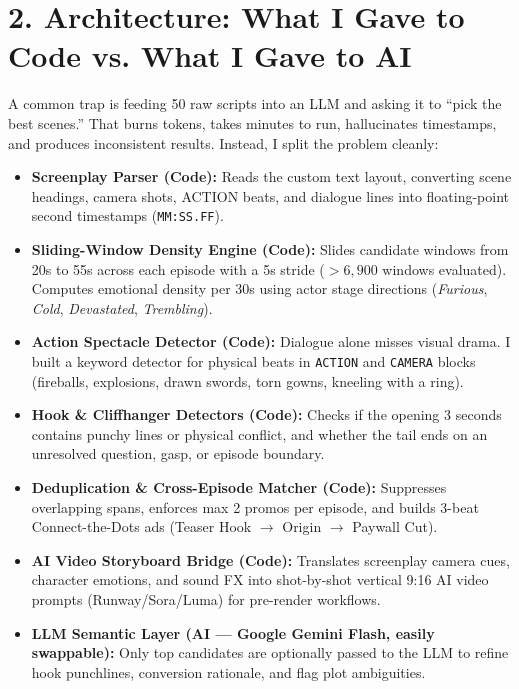 \documentclass[9.5pt,a4paper]{article}
\begin{document}
\section{2. Architecture: What I Gave to Code vs. What I Gave to AI}
A common trap is feeding 50 raw scripts into an LLM and asking it to ``pick the best scenes.'' That burns tokens, takes minutes to run, hallucinates timestamps, and produces inconsistent results. Instead, I split the problem cleanly:

\begin{itemize}
    \item \textbf{Screenplay Parser (Code):} Reads the custom text layout, converting scene headings, camera shots, ACTION beats, and dialogue lines into floating-point second timestamps (\texttt{MM:SS.FF}).
    \item \textbf{Sliding-Window Density Engine (Code):} Slides candidate windows from 20s to 55s across each episode with a 5s stride ($>6{,}900$ windows evaluated). Computes emotional density per 30s using actor stage directions (\textit{Furious}, \textit{Cold}, \textit{Devastated}, \textit{Trembling}).
    \item \textbf{Action Spectacle Detector (Code):} Dialogue alone misses visual drama. I built a keyword detector for physical beats in \texttt{ACTION} and \texttt{CAMERA} blocks (fireballs, explosions, drawn swords, torn gowns, kneeling with a ring).
    \item \textbf{Hook \& Cliffhanger Detectors (Code):} Checks if the opening 3 seconds contains punchy lines or physical conflict, and whether the tail ends on an unresolved question, gasp, or episode boundary.
    \item \textbf{Deduplication \& Cross-Episode Matcher (Code):} Suppresses overlapping spans, enforces max 2 promos per episode, and builds 3-beat Connect-the-Dots ads (Teaser Hook $\to$ Origin $\to$ Paywall Cut).
    \item \textbf{AI Video Storyboard Bridge (Code):} Translates screenplay camera cues, character emotions, and sound FX into shot-by-shot vertical 9:16 AI video prompts (Runway/Sora/Luma) for pre-render workflows.
    \item \textbf{LLM Semantic Layer (AI --- Google Gemini Flash, easily swappable):} Only top candidates are optionally passed to the LLM to refine hook punchlines, conversion rationale, and flag plot ambiguities.
\end{itemize}
\end{document}
